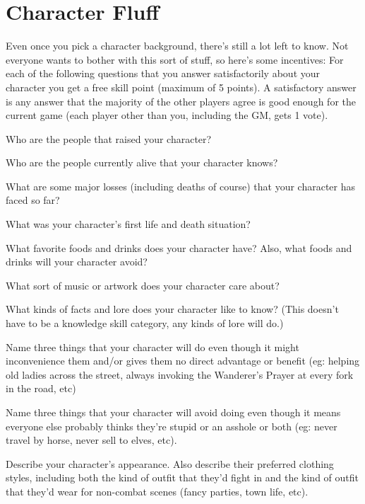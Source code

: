 \section{Character Fluff}

Even once you pick a character background, there's still a lot left to know. Not everyone wants to bother with this sort of stuff, so here's some incentives: For each of the following questions that you answer satisfactorily about your character you get a free skill point (maximum of 5 points). A satisfactory answer is any answer that the majority of the other players agree is good enough for the current game (each player other than you, including the GM, gets 1 vote).

\begin{itemize*}
\item Who are the people that raised your character?
\item Who are the people currently alive that your character knows?
\item What are some major losses (including deaths of course) that your character has faced so far?
\item What was your character's first life and death situation?
\item What favorite foods and drinks does your character have? Also, what foods and drinks will your character avoid?
\item What sort of music or artwork does your character care about?
\item What kinds of facts and lore does your character like to know? (This doesn't have to be a knowledge skill category, any kinds of lore will do.)
\item Name three things that your character will do even though it might inconvenience them and/or gives them no direct advantage or benefit (eg: helping old ladies across the street, always invoking the Wanderer's Prayer at every fork in the road, etc)
\item Name three things that your character will avoid doing even though it means everyone else probably thinks they're stupid or an asshole or both (eg: never travel by horse, never sell to elves, etc).
\item Describe your character's appearance. Also describe their preferred clothing styles, including both the kind of outfit that they'd fight in and the kind of outfit that they'd wear for non-combat scenes (fancy parties, town life, etc).
\end{itemize*}
